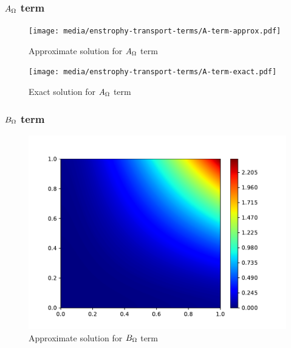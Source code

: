 \subsubsection{$A_{\Omega}$ term}
\begin{figure}[H]
    \texttt{[image: media/enstrophy-transport-terms/A-term-approx.pdf]}
    \caption{Approximate solution for $A_{\Omega}$ term}
    \label{fig:a-approx}
\end{figure}

\begin{figure}[H]
    \texttt{[image: media/enstrophy-transport-terms/A-term-exact.pdf]}
    \caption{Exact solution for $A_{\Omega}$ term}
    \label{fig:a-exact}
\end{figure}
\vfill

\subsubsection{$B_{\Omega}$ term}
\begin{figure}[H]
    \includegraphics[height=0.35\textheight]{media/enstrophy-transport-terms/C-term-approx.pdf}
    \caption{Approximate solution for $B_{\Omega}$ term}
    \label{fig:b-approx}
\end{figure}
